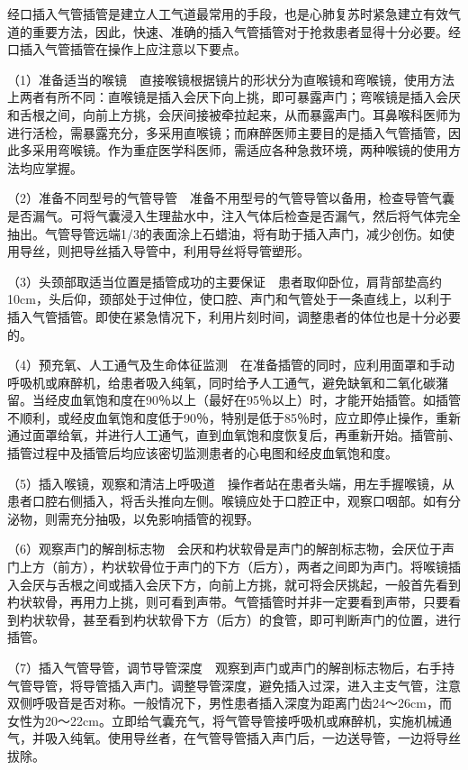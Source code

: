 经口插入气管插管是建立人工气道最常用的手段，也是心肺复苏时紧急建立有效气道的重要方法，因此，快速、准确的插入气管插管对于抢救患者显得十分必要。经口插入气管插管在操作上应注意以下要点。

（1）准备适当的喉镜　直接喉镜根据镜片的形状分为直喉镜和弯喉镜，使用方法上两者有所不同：直喉镜是插入会厌下向上挑，即可暴露声门；弯喉镜是插入会厌和舌根之间，向前上方挑，会厌间接被牵拉起来，从而暴露声门。耳鼻喉科医师为进行活检，需暴露充分，多采用直喉镜；而麻醉医师主要目的是插入气管插管，因此多采用弯喉镜。作为重症医学科医师，需适应各种急救环境，两种喉镜的使用方法均应掌握。

（2）准备不同型号的气管导管　准备不用型号的气管导管以备用，检查导管气囊是否漏气。可将气囊浸入生理盐水中，注入气体后检查是否漏气，然后将气体完全抽出。气管导管远端1/3的表面涂上石蜡油，将有助于插入声门，减少创伤。如使用导丝，则把导丝插入导管中，利用导丝将导管塑形。

（3）头颈部取适当位置是插管成功的主要保证　患者取仰卧位，肩背部垫高约10cm，头后仰，颈部处于过伸位，使口腔、声门和气管处于一条直线上，以利于插入气管插管。即使在紧急情况下，利用片刻时间，调整患者的体位也是十分必要的。

（4）预充氧、人工通气及生命体征监测　在准备插管的同时，应利用面罩和手动呼吸机或麻醉机，给患者吸入纯氧，同时给予人工通气，避免缺氧和二氧化碳潴留。当经皮血氧饱和度在90％以上（最好在95％以上）时，才能开始插管。如插管不顺利，或经皮血氧饱和度低于90％，特别是低于85％时，应立即停止操作，重新通过面罩给氧，并进行人工通气，直到血氧饱和度恢复后，再重新开始。插管前、插管过程中及插管后均应该密切监测患者的心电图和经皮血氧饱和度。

（5）插入喉镜，观察和清洁上呼吸道　操作者站在患者头端，用左手握喉镜，从患者口腔右侧插入，将舌头推向左侧。喉镜应处于口腔正中，观察口咽部。如有分泌物，则需充分抽吸，以免影响插管的视野。

（6）观察声门的解剖标志物　会厌和杓状软骨是声门的解剖标志物，会厌位于声门上方（前方），杓状软骨位于声门的下方（后方），两者之间即为声门。将喉镜插入会厌与舌根之间或插入会厌下方，向前上方挑，就可将会厌挑起，一般首先看到杓状软骨，再用力上挑，则可看到声带。气管插管时并非一定要看到声带，只要看到杓状软骨，甚至看到杓状软骨下方（后方）的食管，即可判断声门的位置，进行插管。

（7）插入气管导管，调节导管深度　观察到声门或声门的解剖标志物后，右手持气管导管，将导管插入声门。调整导管深度，避免插入过深，进入主支气管，注意双侧呼吸音是否对称。一般情况下，男性患者插入深度为距离门齿24～26cm，而女性为20～22cm。立即给气囊充气，将气管导管接呼吸机或麻醉机，实施机械通气，并吸入纯氧。使用导丝者，在气管导管插入声门后，一边送导管，一边将导丝拔除。

